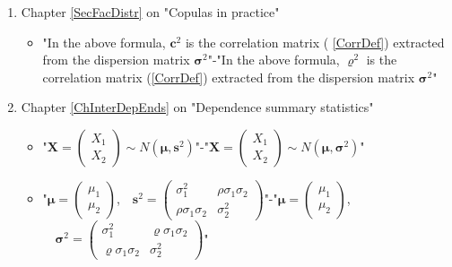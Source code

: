 \documentclass{article}
\begin{document}
\begin{enumerate}
\item Chapter \ref{SecFacDistr} on "Copulas in practice"

\begin{itemize}
\item "In the above formula, $\boldsymbol{c}^{2}$ is the correlation matrix (%
\ref{CorrDef}) extracted from the dispersion matrix $\boldsymbol{\sigma }%
^{2} $"-\TEXTsymbol{>}"In the above formula, $\boldsymbol{\varrho }^{2}$ is
the correlation matrix (\ref{CorrDef}) extracted from the dispersion matrix $%
\boldsymbol{\sigma }^{2}$"
\end{itemize}

\item Chapter \ref{ChInterDepEnds} on "Dependence summary statistics"

\begin{itemize}
\item "$\boldsymbol{X}=\left( 
\begin{smallmatrix}
X_{1} \\ 
X_{2}%
\end{smallmatrix}%
\right) \sim \mathit{N}(\boldsymbol{\mu },\boldsymbol{s}^{2})$"-\TEXTsymbol{>%
}"$\boldsymbol{X}=\left( 
\begin{smallmatrix}
X_{1} \\ 
X_{2}%
\end{smallmatrix}%
\right) \sim \mathit{N}(\boldsymbol{\mu },\boldsymbol{\sigma }^{2})$"

\item "$\boldsymbol{\mu }=\left( 
\begin{smallmatrix}
\mu _{1} \\ 
\mu _{2}%
\end{smallmatrix}%
\right) $,$\quad \boldsymbol{s}^{2}=\left( 
\begin{smallmatrix}
\sigma _{1}^{2} & \rho \sigma _{1}\sigma _{2} \\ 
\rho \sigma _{1}\sigma _{2} & \sigma _{2}^{2}%
\end{smallmatrix}%
\right) $"-\TEXTsymbol{>}"$\boldsymbol{\mu }=\left( 
\begin{smallmatrix}
\mu _{1} \\ 
\mu _{2}%
\end{smallmatrix}%
\right) $,$\quad \boldsymbol{\sigma }^{2}=\left( 
\begin{smallmatrix}
\sigma _{1}^{2} & \varrho \sigma _{1}\sigma _{2} \\ 
\varrho \sigma _{1}\sigma _{2} & \sigma _{2}^{2}%
\end{smallmatrix}%
\right) $"


\end{itemize}
\end{enumerate}
\end{document}
